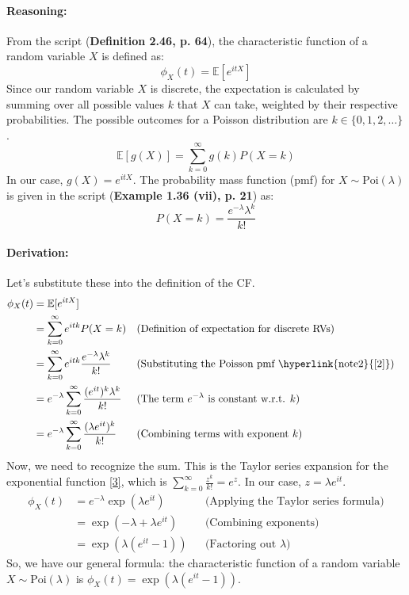 \documentclass[11pt,a4paper]{article}
\begin{document}
\paragraph{Reasoning:}
From the script (\textbf{Definition 2.46, p. 64}), the characteristic function of a random variable $X$ is defined as:
\[ \phi_X(t) = \mathbb{E}[e^{itX}] \]
Since our random variable $X$ is discrete, the expectation is calculated by summing over all possible values $k$ that $X$ can take, weighted by their respective probabilities. The possible outcomes for a Poisson distribution are $k \in \{0, 1, 2, \dots\}$.
\[ \mathbb{E}[g(X)] = \sum_{k=0}^{\infty} g(k) P(X=k) \]
In our case, $g(X) = e^{itX}$. The probability mass function (pmf) for $X \sim \text{Poi}(\lambda)$ is given in the script (\textbf{Example 1.36 (vii), p. 21}) as:
\[ P(X=k) = \frac{e^{-\lambda}\lambda^k}{k!} \]

\paragraph{Derivation:}
Let's substitute these into the definition of the CF.
\begin{align*}
\phi_X(t) &= \mathbb{E}[e^{itX}] \\
&= \sum_{k=0}^{\infty} e^{itk} P(X=k) && \text{(Definition of expectation for discrete RVs)} \\
&= \sum_{k=0}^{\infty} e^{itk} \frac{e^{-\lambda}\lambda^k}{k!} && \text{(Substituting the Poisson pmf \hyperlink{note2}{[2]})} \\
&= e^{-\lambda} \sum_{k=0}^{\infty} \frac{(e^{it})^k \lambda^k}{k!} && \text{(The term } e^{-\lambda} \text{ is constant w.r.t. } k \text{)} \\
&= e^{-\lambda} \sum_{k=0}^{\infty} \frac{(\lambda e^{it})^k}{k!} && \text{(Combining terms with exponent } k \text{)}
\end{align*}
Now, we need to recognize the sum. This is the Taylor series expansion for the exponential function \hyperlink{note3}{[3]}, which is $\sum_{k=0}^{\infty} \frac{z^k}{k!} = e^z$. In our case, $z = \lambda e^{it}$.
\begin{align*}
\phi_X(t) &= e^{-\lambda} \exp(\lambda e^{it}) && \text{(Applying the Taylor series formula)} \\
&= \exp(-\lambda + \lambda e^{it}) && \text{(Combining exponents)} \\
&= \exp(\lambda(e^{it} - 1)) && \text{(Factoring out } \lambda \text{)}
\end{align*}
So, we have our general formula: the characteristic function of a random variable $X \sim \text{Poi}(\lambda)$ is $\phi_X(t) = \exp(\lambda(e^{it} - 1))$.
\end{document}
